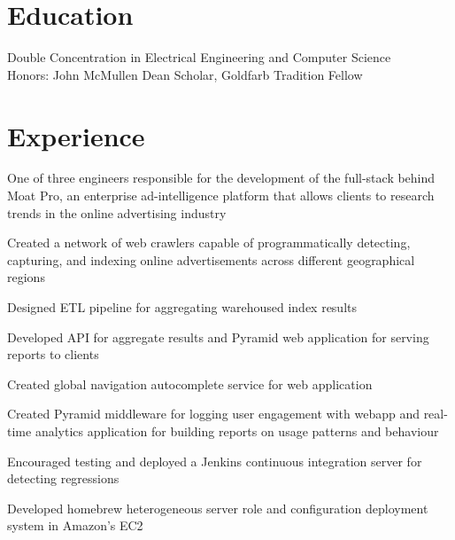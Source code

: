 \documentclass[]{deedy-resume-openfont}
\begin{document}
\lastupdated
{}

\section{Education}
        \hspace{22pt} Double Concentration in Electrical Engineering and Computer Science \\
        \hspace{22pt} Honors: John McMullen Dean Scholar, Goldfarb Tradition Fellow \\
\sectionsep

\section{Experience}

    \begin{tightemize}
        \item
            One of three engineers responsible for the development of the
            full-stack behind Moat Pro, an enterprise ad-intelligence platform
            that allows clients to research trends in the online advertising
            industry
        \item
            Created a network of web crawlers capable of programmatically
            detecting, capturing, and indexing online advertisements across
            different geographical regions
        \item
            Designed ETL pipeline for aggregating warehoused index results
        \item
            Developed API for aggregate results and Pyramid web application for
            serving reports to clients
        \item
            Created global navigation autocomplete service for web application
        \item
            Created Pyramid middleware for logging user engagement with
            webapp and real-time analytics application for building reports on
            usage patterns and behaviour
        \item
            Encouraged testing and deployed a Jenkins continuous integration
            server for detecting regressions
        \item
            Developed homebrew heterogeneous server role and configuration
            deployment system in Amazon’s EC2
    \end{tightemize}
\sectionsep
\end{document}

